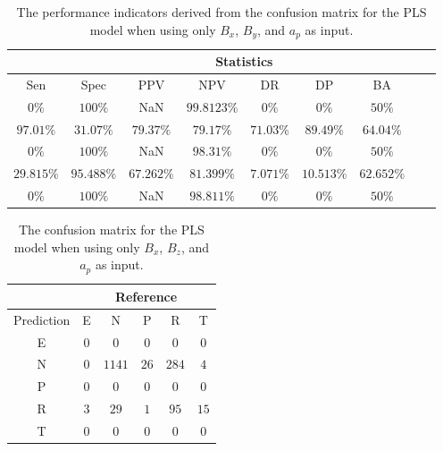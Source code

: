 \begin{table}[!ht]
	\centering
	\begin{tabular}{|c|c|c|c|c|c|c|c|c|}
		\hline
		 & \multicolumn{7}{c|}{Statistics} \\ \hline
		Sen & Spec & PPV & NPV & DR & DP & BA \\ \hline
		$0\%$ & $100\%$ & NaN & $99.8123\%$ & $0\%$ & $0\%$ & $50\%$ \\ \hline
		$97.01\%$ & $31.07\%$ & $79.37\%$ & $79.17\%$ & $71.03\%$ & $89.49\%$ & $64.04\%$ \\ \hline
		$0\%$ & $100\%$ & NaN & $98.31\%$ & $0\%$ & $0\%$ & $50\%$ \\ \hline
		$29.815\%$ & $95.488\%$ & $67.262\%$ & $81.399\%$ & $7.071\%$ & $10.513\%$ & $62.652\%$ \\ \hline
		$0\%$ & $100\%$ & NaN & $98.811\%$ & $0\%$ & $0\%$ & $50\%$ \\ \hline
	\end{tabular}
	\caption{The performance indicators derived from the confusion matrix for the PLS model when using only $B_{x}$, $B_{y}$, and $a_{p}$ as input.}
	\label{tab:cs:xyap:pls}
\end{table}

\begin{table}[!ht]
	\centering
	\begin{tabular}{|c|c|c|c|c|c|}
		\hline
		 & \multicolumn{5}{|c|}{Reference} \\ \hline
		 Prediction & E & N & P & R & T \\ \hline
		 E & $0$ & $0$ & $0$ & $0$ & $0$ \\ \hline
		 N & $0$ & $1141$ & $26$ & $284$ & $4$ \\ \hline
		 P & $0$ & $0$ & $0$ & $0$ & $0$ \\ \hline
		 R & $3$ & $29$ & $1$ & $95$ & $15$ \\ \hline
		 T & $0$ & $0$ & $0$ & $0$ & $0$ \\ \hline
	\end{tabular}
	\caption{The confusion matrix for the PLS model when using only $B_{x}$, $B_{z}$, and $a_{p}$ as input.}
	\label{tab:cm:xzap:pls}
\end{table}

